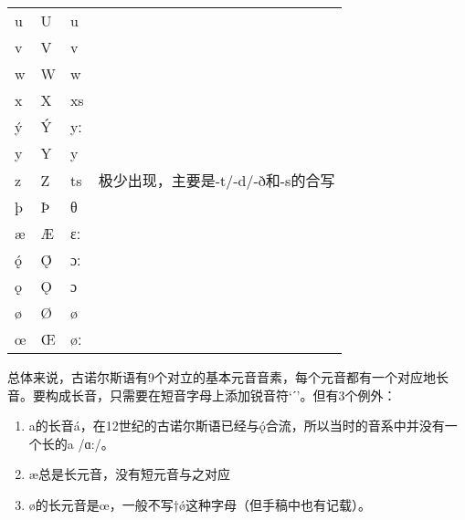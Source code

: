 \begin{table}[H]
\begin{tabular}{@{}llll@{}}
        u        & U        & u                &                                                              \\
        v        & V        & v                &                                                              \\
        w        & W        & w                &                                                              \\
        x        & X        & xs               &                                                              \\
        ý        & Ý        & yː               &                                                              \\
        y        & Y        & y                &                                                              \\
        z        & Z        & ts               & 极少出现，主要是-t/-d/-ð和-s的合写                           \\
        þ        & Þ        & θ                &                                                              \\
        æ        & Æ        & ɛː               &                                                              \\
        ǫ́        & Ǫ́        & ɔː               &                                                              \\
        ǫ        & Ǫ        & ɔ                &                                                              \\
        ø        & Ø        & ø                &                                                              \\
        œ        & Œ        & øː               &                                                              \\ \bottomrule
    \end{tabular}
\end{table}

总体来说，古诺尔斯语有9个对立的基本元音音素，每个元音都有一个对应地长音。要构成长音，只需要在短音字母上添加锐音符`ˊ'。但有3个例外：
\begin{info}
    \begin{enumerate}
        \item a的长音á，在12世纪的古诺尔斯语已经与ǫ́合流，所以当时的音系中并没有一个长的a /ɑ:/。
        \item æ总是长元音，没有短元音与之对应 \footnotemark
        \item ø的长元音是œ，一般不写†\'{ø}这种字母（但手稿中也有记载）。
    \end{enumerate}
\end{info}

